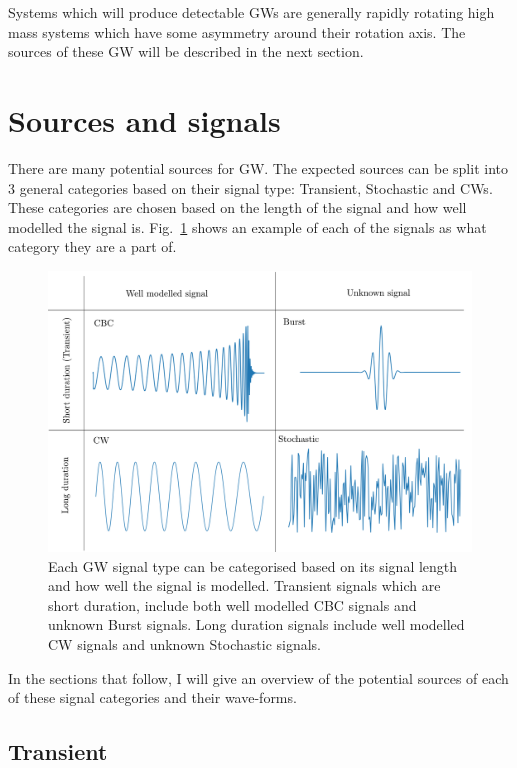 Systems which will produce detectable \acp{GW} are generally rapidly rotating high mass systems which have some asymmetry around their rotation axis.
The sources of these \ac{GW} will be described in the next section.



\section{\label{sources}Sources and signals}

There are many potential sources for \ac{GW}. The expected sources can be split into 3 general categories based on their signal type: Transient, Stochastic and \acp{CW}.
These categories are chosen based on the length of the signal and how well modelled the signal is.
Fig.~\ref{sources:signaltypes} shows an example of each of the signals as what category they are a part of.
%
\begin{figure}[h]
    \centering
    \includegraphics[width=\textwidth]{C1_Introduction/sources_types.pdf}
    \caption{Each \ac{GW} signal type can be categorised based on its signal length and how well the signal is modelled. Transient signals which are short duration, include both well modelled \ac{CBC} signals and unknown Burst signals. Long duration signals include well modelled \ac{CW} signals and unknown Stochastic signals.}
    \label{sources:signaltypes}
\end{figure}
In the sections that follow, I will give an overview of the potential sources of each of these signal categories and their wave-forms.


\subsection{\label{sources:transient} Transient}

